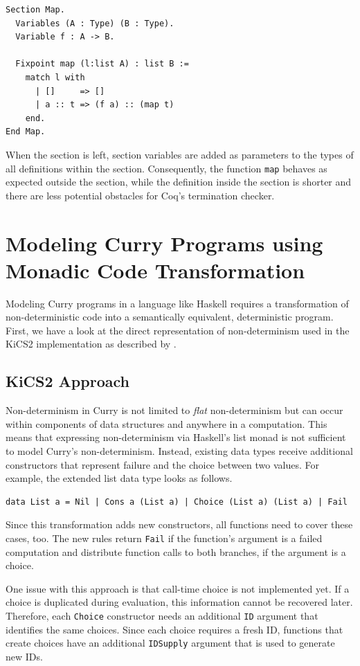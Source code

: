 \documentclass[a4paper, 11pt, fleqn, twoside]{scrreprt}
\newcommand{\hinl}[1]{\texttt{#1}}
\newcommand{\cinl}[1]{\texttt{#1}}
\begin{document}
\begin{verbatim}
Section Map.
  Variables (A : Type) (B : Type).
  Variable f : A -> B.

  Fixpoint map (l:list A) : list B :=
    match l with
      | []     => []
      | a :: t => (f a) :: (map t)
    end.
End Map.
\end{verbatim}

When the section is left, section variables are added as parameters to the types of all definitions within the section.
Consequently, the function \cinl{map} behaves as expected outside the section, while the definition inside the section is shorter and there are less potential obstacles for Coq's termination checker.

\section{Modeling Curry Programs using Monadic Code Transformation}

Modeling Curry programs in a language like Haskell requires a transformation of non-deterministic code into a semantically equivalent, deterministic program.
First, we have a look at the direct representation of non-determinism used in the KiCS2 implementation as described by \citet{brassel2011kics2}.

\subsection{KiCS2 Approach}
Non-determinism in Curry is not limited to \textit{flat} non-determinism but can occur within components of data structures and anywhere in a computation.
This means that expressing non-determinism via Haskell's list monad is not sufficient to model Curry's non-determinism.
Instead, existing data types receive additional constructors that represent failure and the choice between two values.
For example, the extended list data type looks as follows.

\begin{verbatim}
data List a = Nil | Cons a (List a) | Choice (List a) (List a) | Fail
\end{verbatim}

Since this transformation adds new constructors, all functions need to cover these cases, too.
The new rules return \hinl{Fail} if the function's argument is a failed computation and distribute function calls to both branches, if the argument is a choice.

One issue with this approach is that call-time choice is not implemented yet.
If a choice is duplicated during evaluation, this information cannot be recovered later.
Therefore, each \hinl{Choice} constructor needs an additional \hinl{ID} argument that identifies the same choices.
Since each choice requires a fresh ID, functions that create choices have an additional \hinl{IDSupply} argument that is used to generate new IDs.
\end{document}
